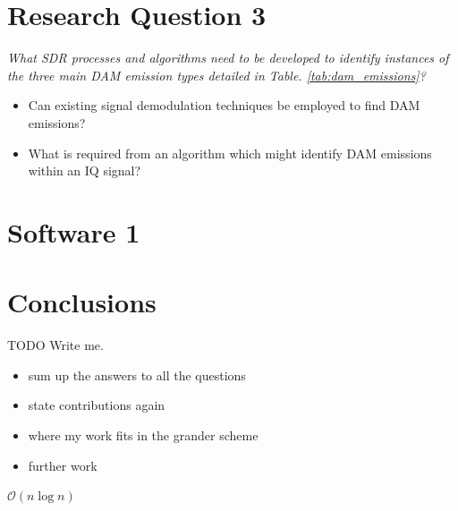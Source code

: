 \documentclass[runningheads,a4paper]{llncs}
\begin{document}
%
%
\newpage
\chapter*{Research Question 3}

\textit{What \gls{SDR} processes and algorithms need to be developed to identify instances of the three main \gls{DAM} emission types detailed in Table. \ref{tab:dam_emissions}?}

\begin{itemize}
	\item Can existing signal demodulation techniques be employed to find \gls{DAM} emissions?
	\item What is required from an algorithm which might identify \gls{DAM} emissions within an \gls{IQ} signal?
\end{itemize}

%
%
\newpage
\chapter*{Software 1}

%
%
\newpage
\chapter*{Conclusions}
TODO Write me.

\begin{itemize}
  \item sum up the answers to all the questions
  \item state contributions again
  \item where my work fits in the grander scheme
  \item further work
\end{itemize}

$\mathcal{O}(n\log{}n)$

\citep{octave-09} \citep{RSGB-14}
\end{document}
